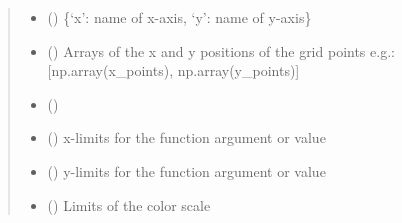 \documentclass[letterpaper,10pt,english,openany,oneside]{sphinxmanual}
\begin{document}
\begin{fulllineitems}
\begin{fulllineitems}
\begin{quote}
\begin{description}
\begin{itemize}
\item {} 
 () \textendash{} \{‘x’: name of x-axis, ‘y’: name of y-axis\}

\item {} 
 (\sphinxstyleliteralemphasis{\sphinxupquote{ {[}}}\sphinxstyleliteralemphasis{\sphinxupquote{{]}}}) \textendash{} Arrays of the x and y positions of the grid points e.g.: {[}np.array(x\_points), np.array(y\_points){]}

\item {} 
 () \textendash{} 

\item {} 
 (\sphinxstyleliteralemphasis{\sphinxupquote{ {[}}}\sphinxstyleliteralemphasis{\sphinxupquote{{]}}}\sphinxstyleliteralemphasis{\sphinxupquote{, }}\sphinxstyleliteralemphasis{\sphinxupquote{, }}) \textendash{} x-limits for the function argument or value

\item {} 
 (\sphinxstyleliteralemphasis{\sphinxupquote{ {[}}}\sphinxstyleliteralemphasis{\sphinxupquote{{]}}}\sphinxstyleliteralemphasis{\sphinxupquote{, }}\sphinxstyleliteralemphasis{\sphinxupquote{, }}) \textendash{} y-limits for the function argument or value

\item {} 
 (\sphinxstyleliteralemphasis{\sphinxupquote{ {[}}}\sphinxstyleliteralemphasis{\sphinxupquote{{]}}}\sphinxstyleliteralemphasis{\sphinxupquote{, }}\sphinxstyleliteralemphasis{\sphinxupquote{, }}\sphinxstyleliteralemphasis{\sphinxupquote{(}}\sphinxstyleliteralemphasis{\sphinxupquote{,}}\sphinxstyleliteralemphasis{\sphinxupquote{)}}) \textendash{} Limits of the color scale


\end{itemize}
\end{description}
\end{quote}
\end{fulllineitems}
\end{fulllineitems}
\end{document}
